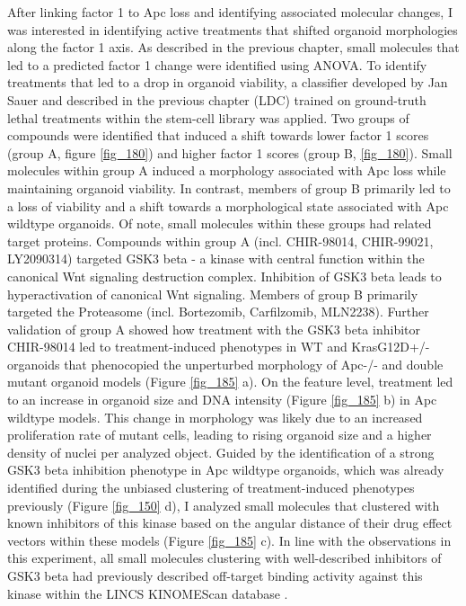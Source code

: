 \begin{flushleft}
After linking factor 1 to Apc loss and identifying associated molecular changes, I was interested in identifying active treatments that shifted organoid morphologies along the factor 1 axis. As described in the previous chapter, small molecules that led to a predicted factor 1 change were identified using ANOVA. To identify treatments that led to a drop in organoid viability, a classifier developed by Jan Sauer and described in the previous chapter (LDC) trained on ground-truth lethal treatments within the stem-cell library was applied. Two groups of compounds were identified that induced a shift towards lower factor 1 scores (group A, figure \ref{fig_180}) and higher factor 1 scores (group B, \ref{fig_180}). Small molecules within group A induced a morphology associated with Apc loss while maintaining organoid viability. In contrast, members of group B primarily led to a loss of viability and a shift towards a morphological state associated with Apc wildtype organoids. Of note, small molecules within these groups had related target proteins. Compounds within group A (incl. CHIR-98014, CHIR-99021, LY2090314) targeted GSK3 beta - a kinase with central function within the canonical Wnt signaling destruction complex. Inhibition of GSK3 beta leads to hyperactivation of canonical Wnt signaling. Members of group B primarily targeted the Proteasome (incl. Bortezomib, Carfilzomib, MLN2238). Further validation of group A showed how treatment with the GSK3 beta inhibitor CHIR-98014 led to treatment-induced phenotypes in WT and KrasG12D+/- organoids that phenocopied the unperturbed morphology of Apc-/- and double mutant organoid models (Figure \ref{fig_185} a). On the feature level, treatment led to an increase in organoid size and DNA intensity (Figure \ref{fig_185} b) in Apc wildtype models. This change in morphology was likely due to an increased proliferation rate of mutant cells, leading to rising organoid size and a higher density of nuclei per analyzed object. Guided by the identification of a strong GSK3 beta inhibition phenotype in Apc wildtype organoids, which was already identified during the unbiased clustering of treatment-induced phenotypes previously (Figure \ref{fig_150} d), I analyzed small molecules that clustered with known inhibitors of this kinase based on the angular distance of their drug effect vectors within these models (Figure \ref{fig_185} c). In line with the observations in this experiment, all small molecules clustering with well-described inhibitors of GSK3 beta had previously described off-target binding activity against this kinase within the LINCS KINOMEScan database \cite{Duan2014-ku}. 


\end{flushleft}
